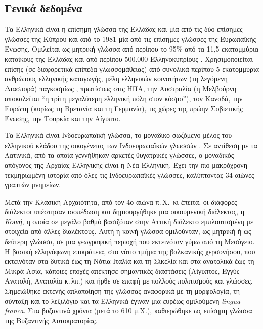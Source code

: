 \documentclass[]{../../metanetpaper}
\begin{document}
\begin{multicols}{2}
\subsection{Γενικά δεδομένα}

Τα Ελληνικά είναι η επίσημη γλώσσα της Ελλάδας και μία από τις δύο επίσημες γλώσσες της Κύπρου και από το 1981 μία από τις επίσημες γλώσσες της Ευρωπαϊκής Ένωσης. Ομιλείται ως μητρική γλώσσα από περίπου το 95\% από τα 11,5 εκατομμύρια κατοίκους της Ελλάδας και από περίπου 500.000 Ελληνοκυπρίους \cite{Stat1}. Χρησιμοποιείται επίσης (σε διαφορετικά επίπεδα γλωσσομάθειας)  από συνολικά περίπου 5 εκατομμύρια ανθρώπους ελληνικής καταγωγής, μέλη ελληνικών κοινοτήτων (τη λεγόμενη Διασπορά) παγκοσμίως \cite{Dias1}, πρωτίστως στις ΗΠΑ, την Αυστραλία (η Μελβούρνη αποκαλείται “η τρίτη μεγαλύτερη ελληνική πόλη στον κόσμο”), τον Καναδά, την Ευρώπη (κυρίως τη Βρετανία και τη Γερμανία), τις χώρες της πρώην Σοβιετικής Ένωσης, την Τουρκία και την Αίγυπτο.

Τα Ελληνικά είναι Ινδοευρωπαϊκή γλώσσα, το μοναδικό σωζόμενο μέλος του ελληνικού κλάδου της οικογένειας των Ινδοευρωπαϊκών γλωσσών \cite{Trud1}. Σε αντίθεση με τα Λατινικά, από τα οποία γεννήθηκαν αρκετές θυγατρικές γλώσσες, ο μοναδικός απόγονος της  Αρχαίας Ελληνικής είναι η Νέα Ελληνική. Έχει την πιο μακρόχρονη τεκμηριωμένη ιστορία από όλες τις Ινδοευρωπαϊκές γλώσσες, καλύπτοντας 34 αιώνες γραπτών μνημείων.

Μετά την Κλασική Αρχαιότητα, από τον 4ο αιώνα π.\,Χ.~κι έπειτα, οι διάφορες διάλεκτοι υπέστησαν ισοπέδωση και δημιουργήθηκε μια οικουμενική διάλεκτος, η \textit{Κοινή}, η οποία σε μεγάλο βαθμό βασιζόταν στην Αττική διάλεκτο εμπλουτισμένη με στοιχεία από άλλες διαλέκτους. Αυτή η κοινή γλώσσα ομιλούνταν, ως μητρική ή ως δεύτερη γλώσσα, σε μια γεωγραφική περιοχή  που εκτεινόταν γύρω από τη Μεσόγειο. Η βασική ελληνόφωνη επικράτεια, στο  νότιο τμήμα της βαλκανικής χερσονήσου, που εκτεινόταν στα δυτικά έως τη Νότια Ιταλία και τη Σικελία και στα ανατολικά έως τη Μικρά Ασία, κάποιες εποχές απέκτησε σημαντικές διαστάσεις (Αίγυπτος, Εγγύς Ανατολή, Ανατολία κ.\,λπ.) και ήρθε σε επαφή με πολλούς πολιτισμούς και γλώσσες. Σημειώθηκε εκτενής απλοποίηση της γλώσσας αναφορικά με τη μορφολογία, τη σύνταξη και το λεξιλόγιο και τα Ελληνικά έγιναν μια ευρέως ομιλούμενη \textit{lingua franca}. Στα βυζαντινά χρόνια (μετά το 610 μ.Χ.), καθιερώθηκε ως επίσημη γλώσσα της Βυζαντινής Αυτοκρατορίας.


\end{multicols}
\end{document}
